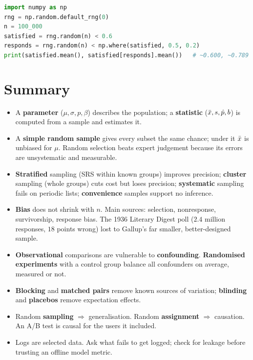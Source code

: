 \begin{lstlisting}[language=Python]
import numpy as np
rng = np.random.default_rng(0)
n = 100_000
satisfied = rng.random(n) < 0.6
responds = rng.random(n) < np.where(satisfied, 0.5, 0.2)
print(satisfied.mean(), satisfied[responds].mean())   # ~0.600, ~0.789
\end{lstlisting}

\section{Summary}
\label{sec:sampling-summary}

\begin{itemize}
  \item A \textbf{parameter} ($\mu,\sigma,p,\beta$) describes the population; a
  \textbf{statistic} ($\bar{x},s,\hat p,b$) is computed from a sample and estimates it.
  \item A \textbf{simple random sample} gives every subset the same chance; under it
  $\bar{x}$ is unbiased for $\mu$. Random selection beats expert judgement because its
  errors are unsystematic and measurable.
  \item \textbf{Stratified} sampling (SRS within known groups) improves precision;
  \textbf{cluster} sampling (whole groups) cuts cost but loses precision;
  \textbf{systematic} sampling fails on periodic lists; \textbf{convenience} samples
  support no inference.
  \item \textbf{Bias} does not shrink with $n$. Main sources: selection, nonresponse,
  survivorship, response bias. The 1936 Literary Digest poll ($2.4$ million responses,
  $18$ points wrong) lost to Gallup's far smaller, better-designed sample.
  \item \textbf{Observational} comparisons are vulnerable to \textbf{confounding}.
  \textbf{Randomised experiments} with a control group balance all confounders on
  average, measured or not.
  \item \textbf{Blocking} and \textbf{matched pairs} remove known sources of variation;
  \textbf{blinding} and \textbf{placebos} remove expectation effects.
  \item Random \textbf{sampling} $\Rightarrow$ generalisation. Random
  \textbf{assignment} $\Rightarrow$ causation. An A/B test is causal for the users it
  included.
  \item Logs are selected data. Ask what fails to get logged; check for leakage before
  trusting an offline model metric.
\end{itemize}

